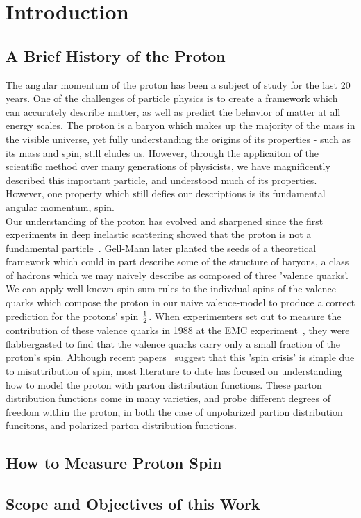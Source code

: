 \chapter{Introduction}

\section{A Brief History of the Proton}
The angular momentum of the proton has been a subject of study for the last 20
years\needcite{}. One of the challenges of particle physics is to create a
framework which can accurately describe matter, as well as predict the behavior
of matter at all energy scales. The proton is a baryon which makes up the
majority of the mass in the visible universe, yet fully understanding the
origins of its properties - such as its mass and spin, still eludes us. However,
through the applicaiton of the scientific method over many generations of
physicists, we have magnificently described this important particle, and
understood much of its properties. However, one property which still defies our
descriptions is its fundamental angular momentum, spin. \\
	
Our understanding of the proton has evolved and sharpened since the first
experiments in deep inelastic scattering showed that the proton is not a
fundamental particle~\cite{PhysRevLett.23.930}. Gell-Mann later planted the
seeds of a theoretical framework which could in part describe some of the
structure of baryons, a class of hadrons which we may naively describe as
composed of three 'valence quarks'\needcite{}. We can apply well known spin-sum
rules to the indivdual spins of the valence quarks which compose the proton in
our naive valence-model to produce a correct prediction for the protons' spin
${1}\over{2}$. When experimenters set out to measure the contribution of these
valence quarks in 1988 at the EMC experiment~\cite{1988PhLB..206..364A}, they
were flabbergasted to find that the valence quarks carry only a small fraction
of the proton's spin. Although recent papers~\cite{1603.05884} suggest that this 'spin
crisis' is simple due to misattribution of spin, most literature to date has
focused on understanding how to model the proton with parton distribution
functions. These parton distribution functions come in many varieties, and probe
different degrees of freedom within the proton, in both the case of unpolarized
partion distribution funcitons, and polarized parton distribution functions. \\
 
\section{How to Measure Proton Spin}

\regtab{}
\sidewaystab{}
\sqfig{}
\pofig{}
\lafig{}

\section{Scope and Objectives of this Work}
